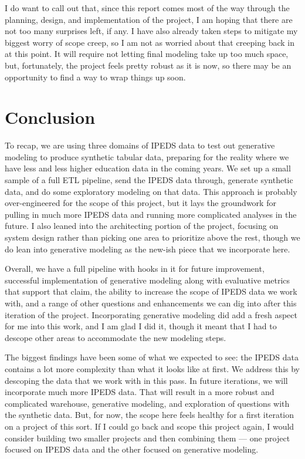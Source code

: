 \documentclass[sigconf, authorversion, nonacm]{acmart}
\begin{document}
    I do want to call out that, since this report comes most of the way through the planning, design, and implementation of the project, I am hoping that there are not too many surprises left, if any. I have also already taken steps to mitigate my biggest worry of scope creep, so I am not as worried about that creeping back in at this point. It will require not letting final modeling take up too much space, but, fortunately, the project feels pretty robust as it is now, so there may be an opportunity to find a way to wrap things up soon.

\section{Conclusion}
    To recap, we are using three domains of IPEDS data to test out generative modeling to produce synthetic tabular data, preparing for the reality where we have less and less higher education data in the coming years. We set up a small sample of a full ETL pipeline, send the IPEDS data through, generate synthetic data, and do some exploratory modeling on that data. This approach is probably over-engineered for the scope of this project, but it lays the groundwork for pulling in much more IPEDS data and running more complicated analyses in the future. I also leaned into the architecting portion of the project, focusing on system design rather than picking one area to prioritize above the rest, though we do lean into generative modeling as the new-ish piece that we incorporate here.

    Overall, we have a full pipeline with hooks in it for future improvement, successful implementation of generative modeling along with evaluative metrics that support that claim, the ability to increase the scope of IPEDS data we work with, and a range of other questions and enhancements we can dig into after this iteration of the project. Incorporating generative modeling did add a fresh aspect for me into this work, and I am glad I did it, though it meant that I had to descope other areas to accommodate the new modeling steps.

    The biggest findings have been some of what we expected to see: the IPEDS data contains a lot more complexity than what it looks like at first. We address this by descoping the data that we work with in this pass. In future iterations, we will incorporate much more IPEDS data. That will result in a more robust and complicated warehouse, generative modeling, and exploration of questions with the synthetic data. But, for now, the scope here feels healthy for a first iteration on a project of this sort. If I could go back and scope this project again, I would consider building two smaller projects and then combining them --- one project focused on IPEDS data and the other focused on generative modeling.
\end{document}
